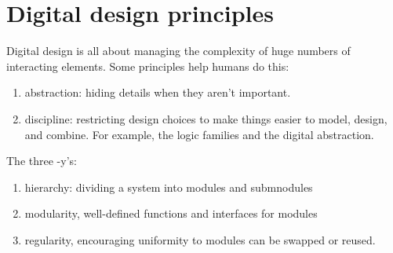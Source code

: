 \section{Digital design principles}

Digital design is all about managing the complexity of huge numbers of interacting elements. Some principles help humans do this:

\begin{enumerate}
    \item abstraction: hiding details when they aren't important.
    \item discipline: restricting design choices to make things easier to model, design, and combine. For example, the logic families and the digital abstraction.
\end{enumerate}

The three -y's:
\begin{enumerate}
    \item hierarchy: dividing a system into modules and submnodules
    \item modularity, well-defined functions and interfaces for modules
    \item regularity, encouraging uniformity to modules can be swapped or reused.
\end{enumerate}
